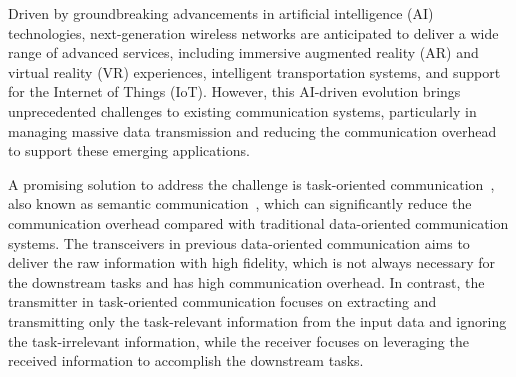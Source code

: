 Driven by groundbreaking advancements in artificial intelligence (AI) technologies, next-generation wireless networks are anticipated to deliver a wide range of advanced services, including immersive augmented reality (AR) and virtual reality (VR) experiences, intelligent transportation systems, and support for the Internet of Things (IoT)\cite{letaief2019roadmap}. However, this AI-driven evolution brings unprecedented challenges to existing communication systems\cite{shi2020communication}, particularly in managing massive data transmission and reducing the communication overhead to support these emerging applications.


A promising solution to address the challenge is task-oriented communication~\cite{vfe,li2024tackling, xu2023edge}, also known as semantic communication~\cite{xie2021deep,xin2024semantic}, which can significantly reduce the communication overhead compared with traditional data-oriented communication systems. The transceivers in previous data-oriented communication aims to deliver the raw information with high fidelity, which is not always necessary for the downstream tasks and has high communication overhead. 
In contrast, the transmitter in task-oriented communication focuses on extracting and transmitting only the task-relevant information from the input data and ignoring the task-irrelevant information, while the receiver focuses on leveraging the received information to accomplish the downstream tasks.


